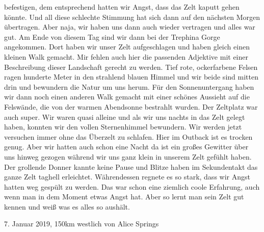 \documentclass[11pt]{book}
\begin{document}
befestigen, dem entsprechend hatten wir Angst, dass das Zelt kaputt gehen könnte. Und all diese schlechte Stimmung hat sich dann
auf den nächsten Morgen übertragen. Aber naja, wir haben uns dann auch wieder vertragen und alles war gut. Am Ende von diesem Tag
sind wir dann bei der Trephina Gorge angekommen. Dort haben wir unser Zelt aufgeschlagen und haben gleich einen kleinen Walk 
gemacht. Mir fehlen auch hier die passenden Adjektive mit einer Beschreibung dieser Landschaft gerecht zu werden. Tief rote, 
ockerfarbene Felsen ragen hunderte Meter in den strahlend blauen Himmel und wir beide sind mitten drin und bewundern die Natur 
um uns herum. Für den Sonnenuntergang haben wir dann noch einen anderen Walk gemacht mit einer schönes Aussieht auf die Felswände, 
die von der warmen Abendsonne bestrahlt wurden. Der Zeltplatz war auch super. Wir waren quasi alleine und als wir uns nachts 
in das Zelt gelegt haben, konnten wir den vollen Sternenhimmel bewundern. Wir werden jetzt versuchen immer ohne das Überzelt zu 
schlafen. Hier im Outback ist es trocken genug. Aber wir hatten auch schon eine Nacht da ist ein großes Gewitter über uns hinweg 
gezogen während wir uns ganz klein in unserem Zelt gefühlt haben. Der grollende Donner kannte keine Pause und Blitze haben im 
Sekundentakt das ganze Zelt taghell erleichtet. Währendessen regnete es so stark, dass wir Angst hatten weg gespült zu werden.
Das war schon eine ziemlich coole Erfahrung, auch wenn man in dem Moment etwas Angst hat. Aber so lernt man sein Zelt gut kennen und 
weiß was es alles so aushält.

7. Januar 2019, 150km westlich von Alice Springs
\end{document}
